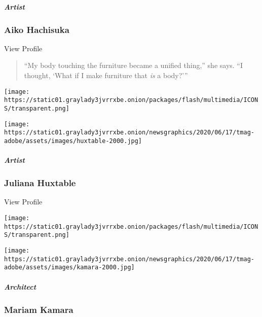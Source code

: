 \href{https://www.nytimes3xbfgragh.onion/2020/08/10/t-magazine/aiko-hachisuka-art-sculpture.html}{}

\hypertarget{artist-1}{%
\subparagraph{Artist}\label{artist-1}}

\hypertarget{aiko-hachisuka}{%
\subsubsection{Aiko Hachisuka}\label{aiko-hachisuka}}

View Profile

\begin{quote}
``My body touching the furniture became a unified thing,'' she says. ``I
thought, `What if I make furniture that \emph{is} a body?'''
\end{quote}

\href{https://www.nytimes3xbfgragh.onion/2020/08/10/t-magazine/juliana-huxtable.html}{}

\texttt{[image: https://static01.graylady3jvrrxbe.onion/packages/flash/multimedia/ICONS/transparent.png]}

\texttt{[image: https://static01.graylady3jvrrxbe.onion/newsgraphics/2020/06/17/tmag-adobe/assets/images/huxtable-2000.jpg]}

\href{https://www.nytimes3xbfgragh.onion/2020/08/10/t-magazine/juliana-huxtable.html}{}

\hypertarget{artist-2}{%
\subparagraph{Artist}\label{artist-2}}

\hypertarget{juliana-huxtable}{%
\subsubsection{Juliana Huxtable}\label{juliana-huxtable}}

View Profile

\href{https://www.nytimes3xbfgragh.onion/2020/08/10/t-magazine/mariam-kamara-architect-design.html}{}

\texttt{[image: https://static01.graylady3jvrrxbe.onion/packages/flash/multimedia/ICONS/transparent.png]}

\texttt{[image: https://static01.graylady3jvrrxbe.onion/newsgraphics/2020/06/17/tmag-adobe/assets/images/kamara-2000.jpg]}

\href{https://www.nytimes3xbfgragh.onion/2020/08/10/t-magazine/mariam-kamara-architect-design.html}{}

\hypertarget{architect}{%
\subparagraph{Architect}\label{architect}}

\hypertarget{mariam-kamara}{%
\subsubsection{Mariam Kamara}\label{mariam-kamara}}

